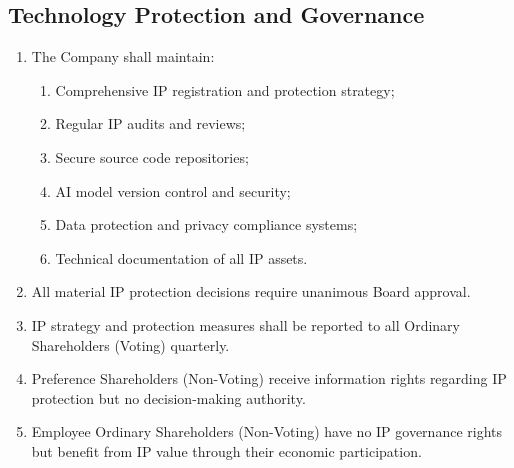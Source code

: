 \subsection{Technology Protection and Governance}
\begin{enumerate}[label=(\alph*)]
\item The Company shall maintain:
    \begin{enumerate}[label=(\roman*)]
    \item Comprehensive IP registration and protection strategy;
    \item Regular IP audits and reviews;
    \item Secure source code repositories;
    \item AI model version control and security;
    \item Data protection and privacy compliance systems;
    \item Technical documentation of all IP assets.
    \end{enumerate}

\item All material IP protection decisions require unanimous Board approval.

\item IP strategy and protection measures shall be reported to all Ordinary Shareholders (Voting) quarterly.

\item Preference Shareholders (Non-Voting) receive information rights regarding IP protection but no decision-making authority.

\item Employee Ordinary Shareholders (Non-Voting) have no IP governance rights but benefit from IP value through their economic participation.
\end{enumerate}

